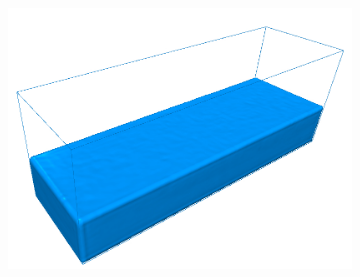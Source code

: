 \begin{figure}[h!]
\begin{subfigure}[t]{.3\textwidth}
        	\includegraphics[scale=0.65]{obrazky-figures/app/Blocks05.jpg}
        	\label{fig:GaussSeidl}
	\end{subfigure}%
	\label{fig:numGauss}
\end{figure}

